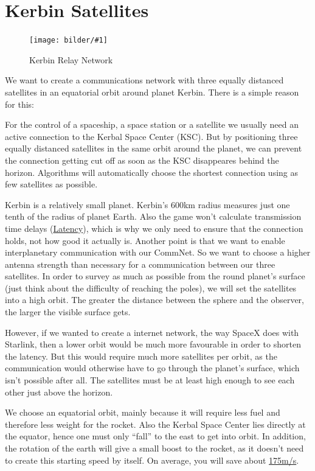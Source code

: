 \documentclass[12pt,paper=A4,numbers=noenddot,bibliography=totoc,listof=totoc,DIV=11,BCOR=1mm]{scrreprt}
\newcommand{\bildscaled}[4]{%
	\begin{figure}[htbp]
	\begin{center}
	\texttt{[image: bilder/\#1]}
	\caption{#3}\label{#2}
	\end{center}
	\end{figure}
}
\begin{document}
\chapter{Kerbin Satellites}

\bildscaled{Kerbin}{kerbin}{Kerbin Relay Network}{0.5}

We want to create a communications network with three equally distanced satellites in an equatorial orbit around planet Kerbin. There is a simple reason for this:

For the control of a spaceship, a space station or a satellite we usually need an active connection to the Kerbal Space Center (KSC).
But by positioning three equally distanced satellites in the same orbit around the planet, we can prevent the connection getting cut off as soon as the KSC disappeares behind the horizon. Algorithms will automatically choose the shortest connection using as few satellites as possible.

Kerbin is a relatively small planet. Kerbin's 600km radius measures just one tenth of the radius of planet Earth. Also the game won't calculate transmission time delays (\href{https://www.wikiwand.com/en/Latency_(engineering)}{Latency}), which is why we only need to ensure that the connection holds, not how good it actually is. Another point is that we want to enable interplanetary communication with our CommNet. So we want to choose a higher antenna strength than necessary for a communication between our three satellites. In order to survey as much as possible from the round planet’s surface (just think about the difficulty of reaching the poles), we will set the satellites into a high orbit. The greater the distance between the sphere and the observer, the larger the visible surface gets.

However, if we wanted to create a internet network, the way SpaceX does with Starlink, then a lower orbit would be much more favourable in order to shorten the latency. But this would require much more satellites per orbit, as the communication would otherwise have to go through the planet's surface, which isn't possible after all. The satellites must be at least high enough to see each other just above the horizon.

We choose an equatorial orbit, mainly because it will require less fuel and therefore less weight for the rocket. Also the Kerbal Space Center lies directly at the equator, hence one must only ``fall'' to the east to get into orbit. In addition, the rotation of the earth will give a small boost to the rocket, as it doesn't need to create this starting speed by itself. On average, you will save about \href{https://wiki.kerbalspaceprogram.com/wiki/Kerbin}{175m/s}.
\end{document}

